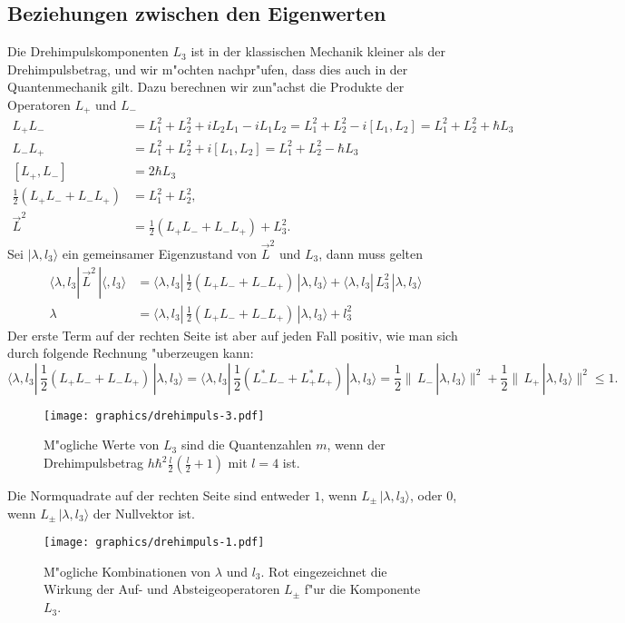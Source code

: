 \subsection{Beziehungen zwischen den Eigenwerten}
Die Drehimpulskomponenten $L_3$ ist in der klassischen Mechanik kleiner
als der Drehimpulsbetrag, und wir m"ochten nachpr"ufen, dass dies auch
in der Quantenmechanik gilt.
Dazu berechnen wir zun"achst die Produkte der Operatoren $L_+$ und $L_-$
\begin{align*}
L_+L_-
&=
L_1^2+L_2^2 +iL_2L_1-iL_1L_2=L_1^2+L_2^2 -i[L_1,L_2]=L_1^2+L_2^2+\hbar L_3
\\
L_-L_+
&=
L_1^2  + L_2^2 +i[L_1,L_2]=L_1^2+L_2^2-\hbar L_3
\\
[L_+,L_-]
&=
2\hbar L_3
\\
{\textstyle \frac12}(L_+L_-+L_-L_+)&=L_1^2+L_2^2,
\\
\vec L^2
&=
{\textstyle\frac12}(L_+L_-+L_-L_+)+L_3^2.
\end{align*}
Sei $|\lambda,l_3\rangle$ ein gemeinsamer Eigenzustand von $\vec L^2$
und $L_3$, dann muss gelten
\begin{align*}
\langle \lambda,l_3|\,\vec L^2\,|\langle, l_3\rangle
&=
\langle \lambda,l_3|
\,
{\textstyle\frac12}(L_+L_-+L_-L_+)
\,
|\lambda,l_3\rangle
+
\langle \lambda,l_3|
\,
L_3^2
\,
|\lambda,l_3\rangle
\\
\lambda
&=
\langle \lambda,l_3|
\,
{\textstyle\frac12}(L_+L_-+L_-L_+)
\,
|\lambda,l_3\rangle
+
l_3^2
\end{align*}
Der erste Term auf der rechten Seite ist aber auf jeden Fall positiv,
wie man sich durch folgende Rechnung "uberzeugen kann:
\[
\langle \lambda,l_3|
\,
{\textstyle\frac12}(L_+L_-+L_-L_+)
\,
|\lambda,l_3\rangle
=
\langle \lambda,l_3|
\,
{\textstyle\frac12}(L_-^*L_-+L_+^*L_+)
\,
|\lambda,l_3\rangle
=
\frac12\|\,L_-\,|\lambda,l_3\rangle\|^2
+
\frac12\|\,L_+\,|\lambda,l_3\rangle\|^2
\le 1.
\]
\begin{figure}
\centering
\texttt{[image: graphics/drehimpuls-3.pdf]}
\caption{M"ogliche Werte von $L_3$ sind die Quantenzahlen $m$, wenn
der Drehimpulsbetrag $h\hbar^2 \frac{l}2(\frac{l}2+1)$ mit $l=4$ ist.
\label{skript:drehimpulsrange}}
\end{figure}%
Die Normquadrate auf der rechten Seite sind entweder $1$,
wenn $L_\pm\,|\lambda,l_3\rangle$, oder 0, wenn $L_\pm\,|\lambda,l_3\rangle$
der Nullvektor ist.
\begin{figure}
\centering
\texttt{[image: graphics/drehimpuls-1.pdf]}
\caption{M"ogliche Kombinationen von $\lambda$ und $l_3$. Rot eingezeichnet
die Wirkung der Auf- und Absteigeoperatoren $L_\pm$ f"ur die Komponente $L_3$.
\label{skript:drehimpulsspektrum}}
\end{figure}
